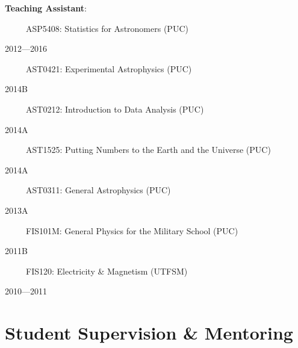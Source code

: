 \documentclass[12pt, a4paper]{article} %
\begin{document}
\begin{flushleft}%
  \setlength{\leftskip}{0.2cm}%
\textbf{Teaching Assistant}:
\end{flushleft}
\begin{minipage}[t]{0.6\textwidth}
\ \ \ \ \ ASP5408: Statistics for Astronomers (PUC)
\end{minipage}
\begin{minipage}[t]{0.4\textwidth}
\hfill 2012---2016
\end{minipage}
\begin{minipage}[t]{0.7\textwidth}
\ \ \ \ \ AST0421: Experimental Astrophysics (PUC)
\end{minipage}
\begin{minipage}[t]{0.3\textwidth}
\hfill 2014B
\end{minipage}
\begin{minipage}[t]{0.7\textwidth}
\ \ \ \ \ AST0212: Introduction to Data Analysis (PUC)
\end{minipage}
\begin{minipage}[t]{0.3\textwidth}
\hfill 2014A
\end{minipage}
\begin{minipage}[t]{0.7\textwidth}
\ \ \ \ \ AST1525: Putting Numbers to the Earth and the Universe (PUC)
\end{minipage}
\begin{minipage}[t]{0.3\textwidth}
\hfill 2014A
\end{minipage}
\begin{minipage}[t]{0.7\textwidth}
\ \ \ \ \ AST0311: General Astrophysics (PUC)
\end{minipage}
\begin{minipage}[t]{0.3\textwidth}
\hfill 2013A
\end{minipage}
\begin{minipage}[t]{0.7\textwidth}
\ \ \ \ \ FIS101M: General Physics for the Military School (PUC)
\end{minipage}
\begin{minipage}[t]{0.3\textwidth}
\hfill 2011B
\end{minipage}
\begin{minipage}[t]{0.7\textwidth}
\ \ \ \ \ FIS120: Electricity \& Magnetism (UTFSM)
\end{minipage}
\begin{minipage}[t]{0.3\textwidth}
\hfill 2010---2011
\end{minipage}

\section*{Student Supervision \& Mentoring}
\end{document}
